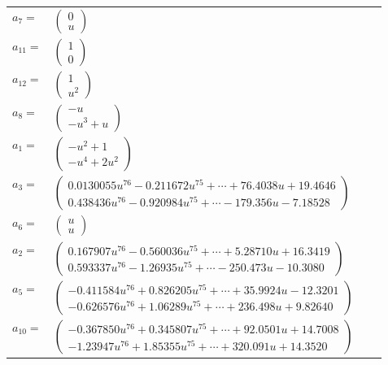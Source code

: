 \documentclass[1p]{elsarticle_modified}
\theoremstyle{definition}
\begin{document}
\begin{tabular}{m{7pt} m{180pt} m{7pt} m{180pt} }
\flushright $a_{7}=$&$\begin{pmatrix}0\\u\end{pmatrix}$ \\
\flushright $a_{11}=$&$\begin{pmatrix}1\\0\end{pmatrix}$ \\
\flushright $a_{12}=$&$\begin{pmatrix}1\\u^2\end{pmatrix}$ \\
\flushright $a_{8}=$&$\begin{pmatrix}- u\\- u^3+u\end{pmatrix}$ \\
\flushright $a_{1}=$&$\begin{pmatrix}- u^2+1\\- u^4+2 u^2\end{pmatrix}$ \\
\flushright $a_{3}=$&$\begin{pmatrix}0.0130055 u^{76}-0.211672 u^{75}+\cdots+76.4038 u+19.4646\\0.438436 u^{76}-0.920984 u^{75}+\cdots-179.356 u-7.18528\end{pmatrix}$ \\
\flushright $a_{6}=$&$\begin{pmatrix}u\\u\end{pmatrix}$ \\
\flushright $a_{2}=$&$\begin{pmatrix}0.167907 u^{76}-0.560036 u^{75}+\cdots+5.28710 u+16.3419\\0.593337 u^{76}-1.26935 u^{75}+\cdots-250.473 u-10.3080\end{pmatrix}$ \\
\flushright $a_{5}=$&$\begin{pmatrix}-0.411584 u^{76}+0.826205 u^{75}+\cdots+35.9924 u-12.3201\\-0.626576 u^{76}+1.06289 u^{75}+\cdots+236.498 u+9.82640\end{pmatrix}$ \\
\flushright $a_{10}=$&$\begin{pmatrix}-0.367850 u^{76}+0.345807 u^{75}+\cdots+92.0501 u+14.7008\\-1.23947 u^{76}+1.85355 u^{75}+\cdots+320.091 u+14.3520\end{pmatrix}$ \\

\end{tabular}
\end{document}
